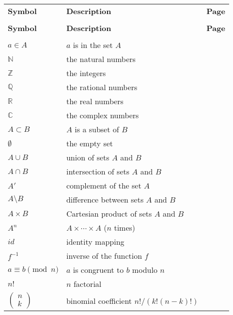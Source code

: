 \begin{center}
\begin{longtable}{llr}
%
\multicolumn{1}{l}{\bf Symbol} & \multicolumn{1}{l}{\bf Description} & \multicolumn{1}{r}{\bf Page} \\
&&\\
\endfirsthead
%
\multicolumn{1}{l}{\bf Symbol} & \multicolumn{1}{l}{\bf Description} & \multicolumn{1}{r}{\bf Page} \\
&&\\
\endhead
%
$a \in A$ & $a$ is in the set $A$ & \pageref{sets_membership} \\
%
${\mathbb N}$ & the natural numbers & \pageref{naturalnum} \\
%
${\mathbb Z}$ & the integers & \pageref{sets_integers} \\
%
${\mathbb Q}$ & the rational numbers & \pageref{rationals} \\
%
${\mathbb R}$ & the real numbers & \pageref{reals} \\
%
${\mathbb C}$ & the complex numbers & \pageref{complexnum} \\
%
$A \subset B$ & $A$ is a subset of $B$ & \pageref{setcontain} \\
%
$\emptyset$ & the empty set & \pageref{theemptyset} \\
%
$A \cup B$ & union of sets $A$ and $B$ & \pageref{union} \\
%
$A \cap B$ & intersection of sets $A$ and $B$ & \pageref{intersection} \\
%
$A'$ & complement of the  set $A$ & \pageref{setcomplement} \\
%
$A \setminus B$ & difference between sets $A$ and $B$ & \pageref{setdifference} \\
%
$A \times B$ & Cartesian product of sets $A$ and $B$ & \pageref{cartesian} \\
%
$A^n$ & $A \times \cdots \times A$ ($n$ times) & \pageref{ncartesian} \\
%
$id$ & identity mapping & \pageref{noteidentity} \\
%
$f^{-1}$ & inverse of the function $f$	& \pageref{inversefunc} \\
%
$a \equiv b \pmod{n}$ & $a$ is congruent to $b$ modulo $n$ & \pageref{amodb} \\
%
$n!$ & $n$ factorial & \pageref{factorial} \\
%
$\left(\begin{array}{c}n \\ k \end{array} \right)$ & binomial coefficient $n!/(k! (n-k)!)$ & \pageref{binomial} \\

\end{longtable}
\end{center}
